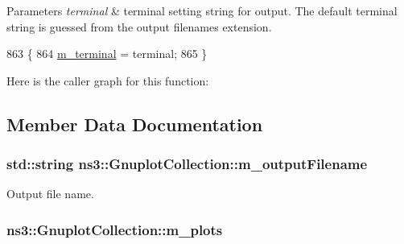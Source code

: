 \begin{DoxyParams}{Parameters}
{\em terminal} & terminal setting string for output. The default terminal string is guessed from the output filename\textquotesingle{}s extension. \\
\hline
\end{DoxyParams}

\begin{DoxyCode}
863 \{
864   \hyperlink{classns3_1_1GnuplotCollection_a99f22d3959512c75b8089649a55af086}{m\_terminal} = terminal;
865 \}
\end{DoxyCode}


Here is the caller graph for this function\+:




\subsection{Member Data Documentation}
\subsubsection[{\texorpdfstring{m\+\_\+output\+Filename}{m_outputFilename}}]{\setlength{\rightskip}{0pt plus 5cm}std\+::string ns3\+::\+Gnuplot\+Collection\+::m\+\_\+output\+Filename\hspace{0.3cm}{\ttfamily [private]}}\hypertarget{classns3_1_1GnuplotCollection_a02b6f2688f131929843ea36ad704f7dd}{}\label{classns3_1_1GnuplotCollection_a02b6f2688f131929843ea36ad704f7dd}


Output file name. 

\subsubsection[{\texorpdfstring{m\+\_\+plots}{m_plots}}]{ ns3\+::\+Gnuplot\+Collection\+::m\+\_\+plots\hspace{0.3cm}{\ttfamily [private]}}\hypertarget{classns3_1_1GnuplotCollection_ab7d2ec530bb8d40492f6dfc44092cd1c}{}\label{classns3_1_1GnuplotCollection_ab7d2ec530bb8d40492f6dfc44092cd1c}


